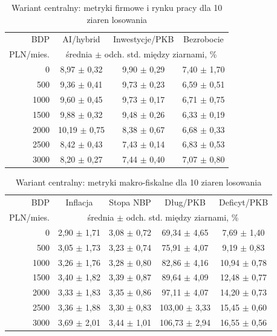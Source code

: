 \begin{table}[H]
\centering
\scriptsize
\caption{Wariant centralny: metryki firmowe i rynku pracy dla 10 ziaren losowania}
\label{tab:terminal-results-real}
\begin{tabular}{@{}rccc@{}}
\toprule
BDP & AI/hybrid & Inwestycje/PKB & Bezrobocie \\
PLN/mies. & \multicolumn{3}{c}{średnia \(\pm\) odch. std. między ziarnami, \%} \\
\midrule
0 & 8,97 \(\pm\) 0,32 & 9,90 \(\pm\) 0,29 & 7,40 \(\pm\) 1,70 \\
500 & 9,36 \(\pm\) 0,41 & 9,73 \(\pm\) 0,23 & 6,59 \(\pm\) 0,51 \\
1000 & 9,60 \(\pm\) 0,45 & 9,73 \(\pm\) 0,17 & 6,71 \(\pm\) 0,75 \\
1500 & 9,88 \(\pm\) 0,32 & 9,48 \(\pm\) 0,26 & 6,33 \(\pm\) 0,19 \\
2000 & 10,19 \(\pm\) 0,75 & 8,38 \(\pm\) 0,67 & 6,68 \(\pm\) 0,33 \\
2500 & 8,42 \(\pm\) 0,43 & 7,43 \(\pm\) 0,14 & 6,83 \(\pm\) 0,53 \\
3000 & 8,20 \(\pm\) 0,27 & 7,44 \(\pm\) 0,40 & 7,07 \(\pm\) 0,80 \\
\bottomrule
\end{tabular}
\end{table}

\begin{table}[H]
\centering
\scriptsize
\caption{Wariant centralny: metryki makro-fiskalne dla 10 ziaren losowania}
\label{tab:terminal-results-macro}
\begin{tabular}{@{}rcccc@{}}
\toprule
BDP & Inflacja & Stopa NBP & Dług/PKB & Deficyt/PKB \\
PLN/mies. & \multicolumn{4}{c}{średnia \(\pm\) odch. std. między ziarnami, \%} \\
\midrule
0 & 2,90 \(\pm\) 1,71 & 3,08 \(\pm\) 0,72 & 69,34 \(\pm\) 4,65 & 7,69 \(\pm\) 1,40 \\
500 & 3,05 \(\pm\) 1,73 & 3,23 \(\pm\) 0,74 & 75,91 \(\pm\) 4,07 & 9,19 \(\pm\) 0,83 \\
1000 & 3,26 \(\pm\) 1,76 & 3,28 \(\pm\) 0,80 & 82,86 \(\pm\) 4,16 & 10,94 \(\pm\) 0,78 \\
1500 & 3,40 \(\pm\) 1,82 & 3,39 \(\pm\) 0,87 & 89,64 \(\pm\) 4,09 & 12,48 \(\pm\) 0,77 \\
2000 & 3,33 \(\pm\) 1,83 & 3,35 \(\pm\) 0,86 & 97,11 \(\pm\) 4,07 & 14,20 \(\pm\) 0,73 \\
2500 & 3,36 \(\pm\) 1,88 & 3,30 \(\pm\) 0,83 & 103,00 \(\pm\) 3,33 & 15,45 \(\pm\) 0,60 \\
3000 & 3,69 \(\pm\) 2,01 & 3,44 \(\pm\) 1,01 & 106,73 \(\pm\) 2,94 & 16,55 \(\pm\) 0,56 \\
\bottomrule
\end{tabular}
\end{table}
